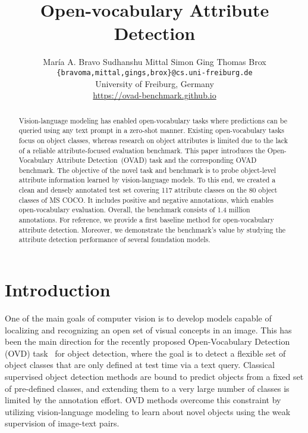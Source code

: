 \documentclass[10pt,twocolumn,letterpaper]{article}
\begin{document}
\title{Open-vocabulary Attribute Detection}

\author{Mar\'ia A. Bravo \qquad Sudhanshu Mittal \qquad Simon Ging \qquad Thomas Brox  \\ {\tt\small \{bravoma,mittal,gings,brox\}@cs.uni-freiburg.de} \\  University of Freiburg, Germany \\
\url{https://ovad-benchmark.github.io}}
\maketitle

\begin{abstract}
Vision-language modeling has enabled open-vocabulary tasks where predictions can be queried using any text prompt in a zero-shot manner. 
Existing open-vocabulary tasks focus on object classes, whereas research on object attributes is limited due to the lack of a reliable attribute-focused evaluation benchmark.
This paper introduces the Open-Vocabulary Attribute Detection~(OVAD) task and the corresponding OVAD benchmark.
The objective of the novel task and benchmark is to probe object-level attribute information learned by vision-language models. 
To this end, we created a clean and densely annotated test set covering 117 attribute classes on the 80 object classes of MS COCO. It includes positive and negative annotations, which enables open-vocabulary evaluation. Overall, the benchmark consists of 1.4 million annotations.
For reference, we provide a first baseline method for open-vocabulary attribute detection. Moreover, we demonstrate the benchmark's value by studying the attribute detection performance of several foundation models.
\end{abstract}

\section{Introduction}\label{sec:intro}
One of the main goals of computer vision is to develop models capable of localizing and recognizing an open set of visual concepts in an image. This has been the main direction for the recently proposed Open-Vocabulary Detection (OVD) task~\cite{ovr_baseline} for object detection, where the goal is to detect a flexible set of object classes that are only defined at test time via a text query.
Classical supervised object detection methods are bound to predict objects from a fixed set of pre-defined classes, and extending them to a very large number of classes is limited by the annotation effort.
OVD methods overcome this constraint by utilizing vision-language modeling to learn about novel objects using the weak supervision of image-text pairs.
\end{document}

